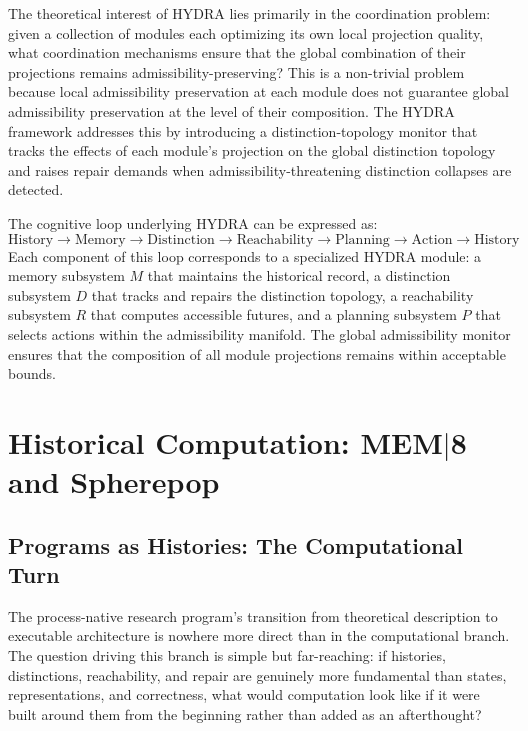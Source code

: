 \documentclass[11pt, oneside]{book}
\theoremstyle{definition}
\theoremstyle{remark}
\begin{document}
The theoretical interest of HYDRA lies primarily in the coordination problem: given a collection of modules each optimizing its own local projection quality, what coordination mechanisms ensure that the global combination of their projections remains admissibility-preserving? This is a non-trivial problem because local admissibility preservation at each module does not guarantee global admissibility preservation at the level of their composition. The HYDRA framework addresses this by introducing a distinction-topology monitor that tracks the effects of each module's projection on the global distinction topology and raises repair demands when admissibility-threatening distinction collapses are detected.

The cognitive loop underlying HYDRA can be expressed as:
\[
\text{History} \to \text{Memory} \to \text{Distinction} \to \text{Reachability} \to \text{Planning} \to \text{Action} \to \text{History}
\]
Each component of this loop corresponds to a specialized HYDRA module: a memory subsystem $M$ that maintains the historical record, a distinction subsystem $D$ that tracks and repairs the distinction topology, a reachability subsystem $R$ that computes accessible futures, and a planning subsystem $P$ that selects actions within the admissibility manifold. The global admissibility monitor ensures that the composition of all module projections remains within acceptable bounds.

\chapter{Historical Computation: MEM$|$8 and Spherepop}

\section{Programs as Histories: The Computational Turn}

The process-native research program's transition from theoretical description to executable architecture is nowhere more direct than in the computational branch. The question driving this branch is simple but far-reaching: if histories, distinctions, reachability, and repair are genuinely more fundamental than states, representations, and correctness, what would computation look like if it were built around them from the beginning rather than added as an afterthought?
\end{document}
